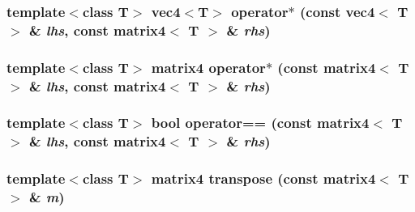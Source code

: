\hypertarget{classnv_1_1matrix4_861c761d9fd0e866b4d7419ce63d70ce}{
\subsubsection[{operator$\ast$}]{\setlength{\rightskip}{0pt plus 5cm}template$<$class T$>$ {\bf vec4}$<$T$>$ operator$\ast$ (const {\bf vec4}$<$ T $>$ \& {\em lhs}, \/  const {\bf matrix4}$<$ T $>$ \& {\em rhs})}}
\label{classnv_1_1matrix4_861c761d9fd0e866b4d7419ce63d70ce}


\hypertarget{classnv_1_1matrix4_32377c4db13e6aaa2cfc16258f4877fd}{
\subsubsection[{operator$\ast$}]{\setlength{\rightskip}{0pt plus 5cm}template$<$class T$>$ {\bf matrix4} operator$\ast$ (const {\bf matrix4}$<$ T $>$ \& {\em lhs}, \/  const {\bf matrix4}$<$ T $>$ \& {\em rhs})}}
\label{classnv_1_1matrix4_32377c4db13e6aaa2cfc16258f4877fd}


\hypertarget{classnv_1_1matrix4_6f106a51a850395024d96e987e5ca5bc}{
\subsubsection[{operator==}]{\setlength{\rightskip}{0pt plus 5cm}template$<$class T$>$ bool operator== (const {\bf matrix4}$<$ T $>$ \& {\em lhs}, \/  const {\bf matrix4}$<$ T $>$ \& {\em rhs})}}
\label{classnv_1_1matrix4_6f106a51a850395024d96e987e5ca5bc}


\hypertarget{classnv_1_1matrix4_59542e7a4af1f5b0e0b3ca8a381c53b7}{
\subsubsection[{transpose}]{\setlength{\rightskip}{0pt plus 5cm}template$<$class T$>$ {\bf matrix4} transpose (const {\bf matrix4}$<$ T $>$ \& {\em m})}}
\label{classnv_1_1matrix4_59542e7a4af1f5b0e0b3ca8a381c53b7}




